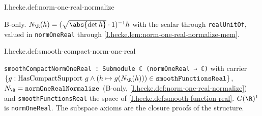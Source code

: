 \begin{definition}
\bonly
{}
\end{definition}
\begin{tfformal}{I.hecke.def:norm-one-real-normalize}
\begin{tffidelity}
B-only. $N_\R(h)=(\sqrt{\abs{\det h}}\cdot1)^{-1}h$ with the scalar through \texttt{realUnitOf}, valued in \texttt{normOneReal} through \cref{I.hecke.lem:norm-one-real-normalize-mem}.
\end{tffidelity}
\end{tfformal}

\begin{definition}[$C_c^\infty(G(\R)^1)$]
\end{definition}
\begin{tfformal}{I.hecke.def:smooth-compact-norm-one-real}
\begin{tffidelity}
\texttt{smoothCompactNormOneReal : Submodule ℂ (normOneReal → ℂ)} with carrier $\{g:\text{HasCompactSupport }g\wedge(h\mapsto g(N_\R(h)))\in\texttt{smoothFunctionsReal}\}$, $N_\R=\texttt{normOneRealNormalize}$ (B-only, \cref{I.hecke.def:norm-one-real-normalize}) and \texttt{smoothFunctionsReal} the space of \cref{I.hecke.def:smooth-function-real}. $G(\R)^1$ is \texttt{normOneReal}. The subspace axioms are the closure proofs of the structure.
\end{tffidelity}
\end{tfformal}

